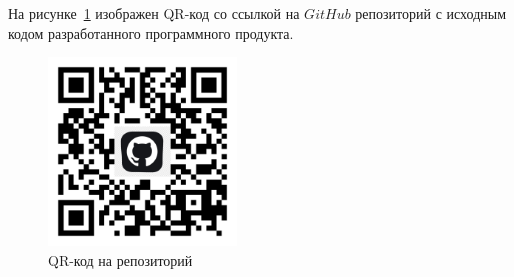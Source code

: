 
На рисунке~\ref{qr} изображен QR-код со ссылкой на $GitHub$ репозиторий с исходным кодом разработанного программного продукта.

\begin{figure}
    \includegraphics[width=5cm]{img/qr-code.png}
    \caption{QR-код на репозиторий}
    \label{qr}
\end{figure}